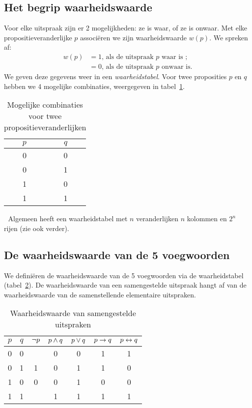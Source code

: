   \subsection{Het begrip waarheidswaarde}
Voor elke uitspraak zijn er 2 mogelijkheden: ze is waar, of ze is onwaar. Met elke propositieveranderlijke $p$ associ\"{e}ren we zijn waarheidswaarde $w(p)$. We spreken af:
\begin{displaymath}
\begin{array}{rl }
    w(p)  & = 1 \mbox{, als de uitspraak } p \mbox{ waar is };  \\
      &  = 0 \mbox{, als de uitspraak } p \mbox{ onwaar is.}
\end{array}
  \end{displaymath}
We geven deze gegevens weer in een \emph{waarheidstabel}. Voor twee proposities $p$ en $q$ hebben we 4 mogelijke combinaties, weergegeven in tabel~\ref{tbl:waarheid}.
\begin{table}[htb]
  \centering
  \caption{Mogelijke combinaties voor twee propositieveranderlijken}\label{tbl:waarheid}
\begin{tabular}{cc}
\toprule
$p$  & $q$  \\ \midrule
0  & 0  \\
0  & 1 \\
1  & 0 \\
1  & 1 \\
\bottomrule
\end{tabular}
\end{table}
\noindent
Algemeen heeft een waarheidstabel met $n$ veranderlijken $n$ kolommen en $2^{n}$ rijen (zie ook verder).

\subsection{De waarheidswaarde van de 5 voegwoorden}
We defini\"{e}ren de waarheidswaarde van de 5 voegwoorden via de waarheidstabel (tabel~\ref{tbl:waarheidvoegwoorden}). De waarheidswaarde van een samengestelde uitspraak hangt af van de waarheidswaarde van de samenstellende elementaire uitspraken.

\begin{table}[htb]
  \centering
  \caption{Waarheidswaarde van samengestelde uitspraken}\label{tbl:waarheidvoegwoorden}
\begin{tabular}{ccccccc}
\toprule
 $p$  & $q$ & $\neg p$ & $p \wedge q$ & $p \vee q$ & $p \rightarrow q$ & $p \leftrightarrow q$ \\
\midrule
  0 & 0 & & 0 & 0 & 1 & 1\\
  0 & 1 & 1 & 0 & 1 & 1 & 0\\
  1 & 0 & 0 & 0 & 1 & 0 & 0\\
  1 & 1 &  & 1 & 1 & 1 & 1\\
\bottomrule
\end{tabular}
\end{table}

